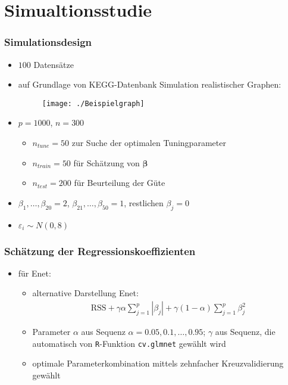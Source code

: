 \documentclass{beamer}
\begin{document}
\section{Simualtionsstudie}
\begin{frame}
	\frametitle{Simulationsdesign}
	\begin{itemize}
	\item $100$ Datensätze
	\item auf Grundlage von KEGG-Datenbank Simulation realistischer Graphen:
	\begin{figure}
	\centering
	\texttt{[image: ./Beispielgraph]}
	\label{fig:beispiel}
	\end{figure}
	\item $p=1000$, $n=300$ 
	\begin{itemize}
	\item $n_{tune}=50$ zur Suche der optimalen Tuningparameter
	\item $n_{train}=50$ für Schätzung von $\boldsymbol{\beta}$
	\item $n_{test}=200$ für Beurteilung der Güte
	\end{itemize}
	\item $\beta_1,\dots,\beta_{20}=2$, $\beta_{21},\dots,\beta_{50}=1$, restlichen $\beta_j=0$
	\item $\varepsilon_i \sim N(0,8)$  
	\end{itemize}
\end{frame}

\begin{frame}
	\frametitle{Schätzung der Regressionskoeffizienten}
	\begin{itemize}
	\item für Enet:
	\begin{itemize}
	\item alternative Darstellung Enet:
	\begin{align*}
	\text{RSS}+\gamma \alpha \sum_{j=1}^{p}|\beta_j| + \gamma (1-\alpha) \sum_{j=1}^{p}\beta_j^2
	\end{align*}
	\item Parameter $\alpha$ aus Sequenz $\alpha={0.05, 0.1, \dots ,0.95}$; $\gamma$ aus Sequenz, die automatisch von \texttt{R}-Funktion \texttt{cv.glmnet} gewählt wird 
	\item optimale Parameterkombination mittels zehnfacher Kreuzvalidierung gewählt
	\end{itemize}
	\end{itemize}
\end{frame}
\end{document}
